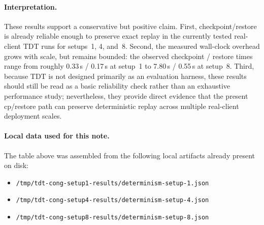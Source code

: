 \documentclass[11pt]{article}
\begin{document}
\paragraph{Interpretation.}
These results support a conservative but positive claim. First, checkpoint/restore is already reliable enough to preserve exact replay in the currently tested real-client TDT runs for setups~1, 4, and~8. Second, the measured wall-clock overhead grows with scale, but remains bounded: the observed checkpoint / restore times range from roughly 0.33\,s / 0.17\,s at setup~1 to 7.80\,s / 0.55\,s at setup~8. Third, because TDT is not designed primarily as an evaluation harness, these results should still be read as a basic reliability check rather than an exhaustive performance study; nevertheless, they provide direct evidence that the present cp/restore path can preserve deterministic replay across multiple real-client deployment scales.

\paragraph{Local data used for this note.}
The table above was assembled from the following local artifacts already present on disk:
\begin{itemize}
    \item \texttt{/tmp/tdt-cong-setup1-results/determinism-setup-1.json}
    \item \texttt{/tmp/tdt-cong-setup4-results/determinism-setup-4.json}
    \item \texttt{/tmp/tdt-cong-setup8-results/determinism-setup-8.json}
\end{itemize}
\end{document}
